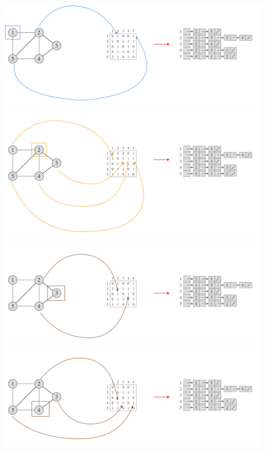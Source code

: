 \documentclass[12pt]{article}
\begin{document}
\begin{enumerate}[1.]
\begin{itemize}
        \begin{center}
        \includegraphics[width=\linewidth]{images/worksheet_4_solution_2.png}
        \includegraphics[width=\linewidth]{images/worksheet_4_solution_3.png}
        \includegraphics[width=\linewidth]{images/worksheet_4_solution_4.png}
        \includegraphics[width=\linewidth]{images/worksheet_4_solution_5.png}

\end{center}
\end{itemize}
\end{enumerate}
\end{document}
